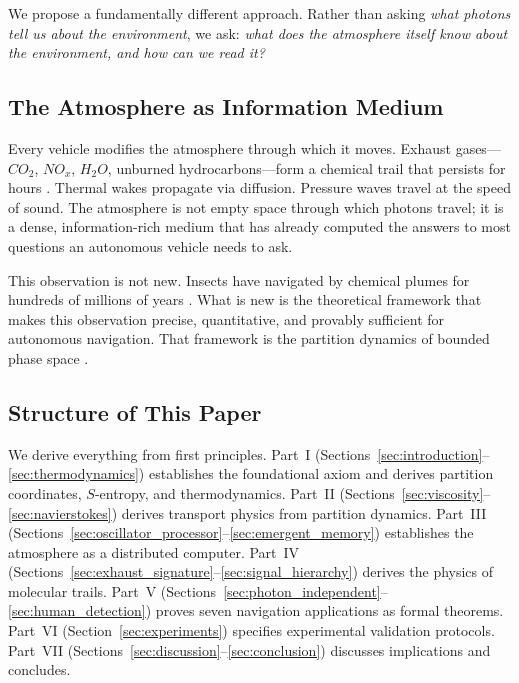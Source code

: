 \documentclass[11pt,twocolumn,a4paper]{article}
\theoremstyle{plain}
\theoremstyle{definition}
\theoremstyle{remark}
\begin{document}
We propose a fundamentally different approach. Rather than asking \emph{what photons tell us about the environment}, we ask: \emph{what does the atmosphere itself know about the environment, and how can we read it?}

\subsection{The Atmosphere as Information Medium}

Every vehicle modifies the atmosphere through which it moves. Exhaust gases---$CO_2$, $NO_x$, $H_2O$, unburned hydrocarbons---form a chemical trail that persists for hours \cite{heywood2018internal, carslaw2005characterisation}. Thermal wakes propagate via diffusion. Pressure waves travel at the speed of sound. The atmosphere is not empty space through which photons travel; it is a dense, information-rich medium that has already computed the answers to most questions an autonomous vehicle needs to ask.

This observation is not new. Insects have navigated by chemical plumes for hundreds of millions of years \cite{murlis1992odor, vergassola2007infotaxis}. What is new is the theoretical framework that makes this observation precise, quantitative, and provably sufficient for autonomous navigation. That framework is the partition dynamics of bounded phase space \cite{sachikonye2026partition, sachikonye2026poincare, sachikonye2026single}.

\subsection{Structure of This Paper}

We derive everything from first principles. Part~I (Sections~\ref{sec:introduction}--\ref{sec:thermodynamics}) establishes the foundational axiom and derives partition coordinates, $S$-entropy, and thermodynamics. Part~II (Sections~\ref{sec:viscosity}--\ref{sec:navierstokes}) derives transport physics from partition dynamics. Part~III (Sections~\ref{sec:oscillator_processor}--\ref{sec:emergent_memory}) establishes the atmosphere as a distributed computer. Part~IV (Sections~\ref{sec:exhaust_signature}--\ref{sec:signal_hierarchy}) derives the physics of molecular trails. Part~V (Sections~\ref{sec:photon_independent}--\ref{sec:human_detection}) proves seven navigation applications as formal theorems. Part~VI (Section~\ref{sec:experiments}) specifies experimental validation protocols. Part~VII (Sections~\ref{sec:discussion}--\ref{sec:conclusion}) discusses implications and concludes.
\end{document}
